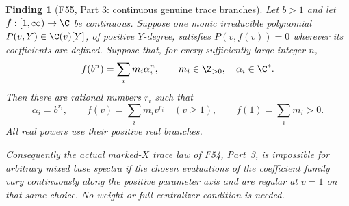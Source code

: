 \documentclass[11pt,a4paper]{article}
\newcommand{\fid}[1]{\textsf{#1}}\newcommand{\gate}[1]{\textsf{#1}}
\theoremstyle{named}\newtheorem{finding}{Finding}[section]
\theoremstyle{definition}\newtheorem{definition}[finding]{Definition}
\theoremstyle{remark}\newtheorem{remark}[finding]{Remark}
\begin{document}
\begin{finding}[\fid{F55}, Part 3: continuous genuine trace branches]
\label{f:continuoustracebranch}
Let $b>1$ and let $f:[1,\infty)\to\C$ be continuous.
Suppose one monic irreducible polynomial
$P(v,Y)\in\C(v)[Y]$, of positive $Y$-degree, satisfies
$P(v,f(v))=0$ wherever its coefficients are defined.
Suppose that, for every sufficiently large integer $n$,
\[
 f(b^n)=\sum_i m_i\alpha_i^n,
 \qquad m_i\in\Z_{>0},\quad \alpha_i\in\C^*.
\]
Then there are rational numbers $r_i$ such that
\begin{equation}\label{eq:continuoustracepositive}
 \alpha_i=b^{r_i},\qquad
 f(v)=\sum_i m_i v^{r_i}\quad(v\ge1),\qquad
 f(1)=\sum_i m_i>0.
\end{equation}
All real powers use their positive real branches.

Consequently the actual marked-$X$ trace law of
\fid{F54}, Part~3, is impossible for arbitrary mixed
base spectra if the chosen evaluations of the coefficient
family vary continuously along the positive parameter
axis and are regular at $v=1$ on that same choice.
No weight or full-centralizer condition is needed.
\end{finding}
\end{document}
